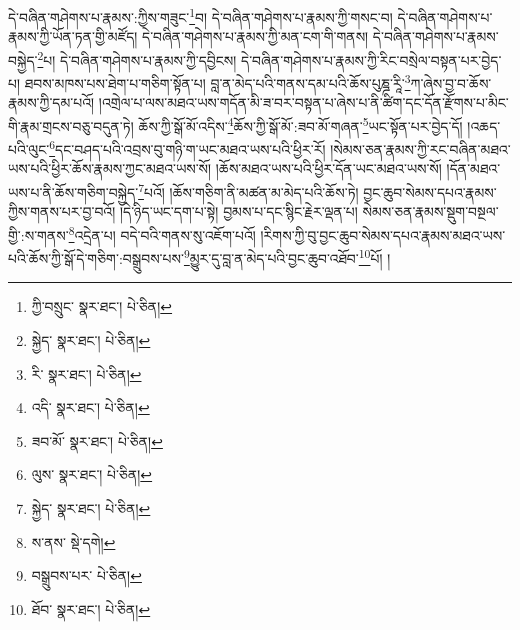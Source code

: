 དེ་བཞིན་གཤེགས་པ་རྣམས་:ཀྱིས་གཟུང་\footnote{ཀྱི་བསྲུང་  སྣར་ཐང་།  པེ་ཅིན། }བ། དེ་བཞིན་གཤེགས་པ་རྣམས་ཀྱི་གསང་བ། དེ་བཞིན་གཤེགས་པ་རྣམས་ཀྱི་ཡོན་ཏན་གྱི་མཛོད། དེ་བཞིན་གཤེགས་པ་རྣམས་ཀྱི་མན་ངག་གི་གནས། དེ་བཞིན་གཤེགས་པ་རྣམས་བསྐྱེད་\footnote{སྐྱེད་  སྣར་ཐང་།  པེ་ཅིན། }པ། དེ་བཞིན་གཤེགས་པ་རྣམས་ཀྱི་དབྱིངས། དེ་བཞིན་གཤེགས་པ་རྣམས་ཀྱི་རིང་བསྲེལ་བསྟན་པར་བྱེད་པ། ཐབས་མཁས་པས་ཐེག་པ་གཅིག་སྟོན་པ། བླ་ན་མེད་པའི་གནས་དམ་པའི་ཆོས་པུཎྜ་རཱི་\footnote{རི་  སྣར་ཐང་།  པེ་ཅིན། }ཀ་ཞེས་བྱ་བ་ཆོས་རྣམས་ཀྱི་དམ་པའོ། །འགྲེལ་པ་ལས་མཐའ་ཡས་གདོན་མི་ཟ་བར་བསྟན་པ་ཞེས་པ་ནི་ཚིག་དང་དོན་རྫོགས་པ་མིང་གི་རྣམ་གྲངས་བཅུ་བདུན་ཏེ། ཆོས་ཀྱི་སྒོ་མོ་འདིས་\footnote{འདི་  སྣར་ཐང་།  པེ་ཅིན། }ཆོས་ཀྱི་སྒོ་མོ་:ཟབ་མོ་གཞན་\footnote{ཟབ་མོ་  སྣར་ཐང་།  པེ་ཅིན། }ཡང་སྟོན་པར་བྱེད་དོ། །འཆད་པའི་ལུང་\footnote{ལུས་  སྣར་ཐང་།  པེ་ཅིན། }དང་བཤད་པའི་འབྲས་བུ་གཉི་ག་ཡང་མཐའ་ཡས་པའི་ཕྱིར་རོ། །སེམས་ཅན་རྣམས་ཀྱི་རང་བཞིན་མཐའ་ཡས་པའི་ཕྱིར་ཆོས་རྣམས་ཀྱང་མཐའ་ཡས་སོ། །ཆོས་མཐའ་ཡས་པའི་ཕྱིར་དོན་ཡང་མཐའ་ཡས་སོ། །དོན་མཐའ་ཡས་པ་ནི་ཆོས་གཅིག་བསྐྱེད་\footnote{སྐྱེད་  སྣར་ཐང་།  པེ་ཅིན། }པའོ། །ཆོས་གཅིག་ནི་མཚན་མ་མེད་པའི་ཆོས་ཏེ། བྱང་ཆུབ་སེམས་དཔའ་རྣམས་ཀྱིས་གནས་པར་བྱ་བའོ། །དེ་ཉིད་ཡང་དག་པ་སྟེ། བྱམས་པ་དང་སྙིང་རྗེར་ལྡན་པ། སེམས་ཅན་རྣམས་སྡུག་བསྔལ་གྱི་:ས་གནས་\footnote{ས་ནས་  སྡེ་དགེ། }འདྲེན་པ། བདེ་བའི་གནས་སུ་འཇོག་པའོ། །རིགས་ཀྱི་བུ་བྱང་ཆུབ་སེམས་དཔའ་རྣམས་མཐའ་ཡས་པའི་ཆོས་ཀྱི་སྒོ་དེ་གཅིག་:བསྒྲུབས་པས་\footnote{བསྒྲུབས་པར་  པེ་ཅིན། }མྱུར་དུ་བླ་ན་མེད་པའི་བྱང་ཆུབ་འཐོབ་\footnote{ཐོབ་  སྣར་ཐང་།  པེ་ཅིན། }པོ། །
